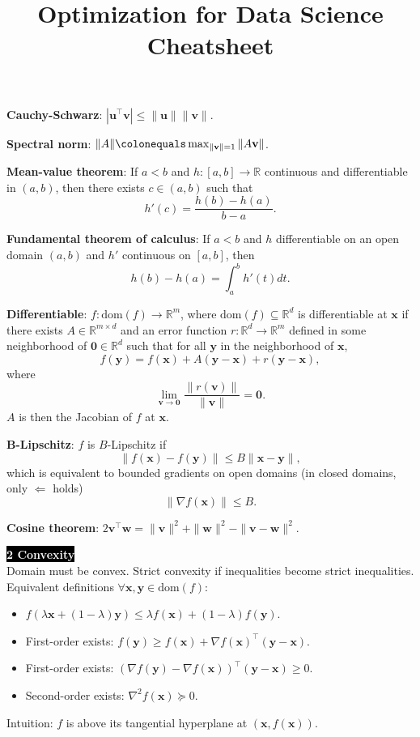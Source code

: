 \documentclass{article}
\title{Optimization for Data Science Cheatsheet}
\newcommand{\R}{\mathbb{R}}
\renewcommand{\vec}[1]{\mathbf{#1}}
\newcommand{\mat}[1]{#1}
\newcommand{\transpose}[1]{#1^\top}
\newcommand{\dom}[1]{\mathrm{dom}(#1)}
\newenvironment{topic}[1]
{\textbf{\sffamily \colorbox{black}{\textcolor{white}{#1}}} \\ \vspace{0.2cm}}
{}
\begin{document}
\setlength{\columnsep}{0.2cm}

\begin{multicols*}{3}
    \textbf{Cauchy-Schwarz}: $|\transpose{\vec{u}} \vec{v}| \leq \| \vec{u} \| \| \vec{v} \|$.

    \textbf{Spectral norm}: $\| \mat{A} \| \colonequals \max_{\| \vec{v} \| = 1} \| \mat{A} \vec{v} \|$.

    \textbf{Mean-value theorem}: If $a < b$ and $h: [a,b] \to \R$ continuous and differentiable in $(a,b)$, then
    there exists $c \in (a,b)$ such that \[
        h'(c) = \frac{h(b) - h(a)}{b-a}.
    \]

    \textbf{Fundamental theorem of calculus}: If $a < b$ and $h$ differentiable on an open domain $(a,b)$ and
    $h'$ continuous on $[a,b]$, then \[
        h(b) - h(a) = \int_a^b h'(t)dt.
    \]

    \textbf{Differentiable}: $f: \dom{f} \to \R^m$, where $\dom{f} \subseteq \R^d$ is differentiable at
    $\vec{x}$ if there exists $\mat{A} \in \R^{m \times d}$ and an error function $r: \R^d \to \R^m$
    defined in some neighborhood of $\vec{0} \in \R^d$ such that for all $\vec{y}$ in the neighborhood
    of $\vec{x}$, \[
        f(\vec{y}) = f(\vec{x}) + \mat{A} (\vec{y} - \vec{x}) + r(\vec{y} - \vec{x}),
    \]
    where \[
        \lim_{\vec{v} \to \vec{0}} \frac{\| r(\vec{v}) \|}{\| \vec{v} \|} = \vec{0}.
    \]
    $\mat{A}$ is then the Jacobian of $f$ at $\vec{x}$.

    \textbf{B-Lipschitz}: $f$ is $B$-Lipschitz if \[
        \| f(\vec{x}) - f(\vec{y}) \| \leq B \| \vec{x} - \vec{y} \|,
    \]
    which is equivalent to bounded gradients on open domains (in closed domains, only $\Leftarrow$
    holds) \[
        \| \nabla f(\vec{x}) \| \leq B.
    \]

    \textbf{Cosine theorem}: $2 \transpose{\vec{v}}\vec{w} = \| \vec{v} \|^2 + \| \vec{w} \|^2 - \| \vec{v} - \vec{w} \|^2$.

    \begin{topic}{2 Convexity}
        Domain must be convex. Strict convexity if inequalities become strict inequalities.
        Equivalent definitions $\forall \vec{x},\vec{y} \in \dom{f}$:
        \begin{itemize}
            \item $f(\lambda \vec{x} + (1-\lambda)\vec{y}) \leq \lambda f(\vec{x}) + (1-\lambda) f(\vec{y})$.
            \item First-order exists: $f(\vec{y}) \geq f(\vec{x}) + \transpose{\nabla f(\vec{x})} (\vec{y} -
                      \vec{x})$.
            \item First-order exists: $\transpose{(\nabla f(\vec{y}) - \nabla f(\vec{x}))} (\vec{y} - \vec{x}) \geq
                      0$.
            \item Second-order exists: $\nabla^2 f(\vec{x}) \succeq \mat{0}$.
        \end{itemize}
        Intuition: $f$ is above its tangential hyperplane at $(\vec{x}, f(\vec{x}))$.


\end{topic}
\end{multicols*}
\end{document}
